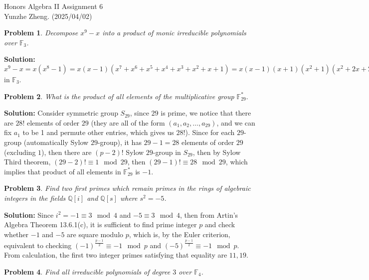 \documentclass[12pt]{article}
\newtheorem{problem}{Problem}
\begin{document}
\noindent Honors Algebra II \hfill Assignment 6\\
Yunzhe Zheng. (2025/04/02)

\hrulefill

\begin{problem}
Decompose $x^9-x$ into a product of monic irreducible polynomials over $\mathbb{F}_{3}$.
\end{problem}

\textbf{Solution:} $x^9-x=x(x^8-1)=x(x-1)(x^7+x^6+x^5+x^4+x^3+x^2+x+1)=x(x-1)(x+1)(x^2+1)(x^2+2x+2)(x^2+x+2)$ in $\mathbb{F}_3$.
\\
\begin{problem}
What is the product of all elements of the multiplicative group $\mathbb{F}_{29}^{*}.$
\end{problem}

\textbf{Solution:} Consider symmetric group $S_{29}$, since $29$ is prime, we notice that there are $28!$ elements of order $29$ (they are all of the form $(a_{1}, a_{2}, \dots, a_{29})$, and we can fix $a_1$ to be 1 and permute other entries, which gives us $28!$). Since for each $29$-group (automatically Sylow $29$-group), it has $29-1=28$ elements of order $29$ (excluding $1$), then there are $(p-2)!$ Sylow $29$-group in $S_{29}$, then by Sylow Third theorem, $(29-2)!\equiv 1\mod 29$, then $(29-1)!\equiv 28\mod 29$, which implies that product of all elements in $\mathbb{F}_{29}^*$ is $-1$.
\\
\begin{problem}
Find two first primes which remain primes in the rings of algebraic integers in the fields $\mathbb{Q}[i]$ and $\mathbb{Q}[s]$ where $s^2=-5$. 
\end{problem}

\textbf{Solution:} Since $i^2=-1\equiv 3\mod 4$ and $-5\equiv 3\mod 4$, then from Artin's Algebra Theorem 13.6.1(c), it is sufficient to find prime integer $p$ and check whether $-1$ and $-5$ are square modulo $p$, which is, by the Euler criterion, equivalent to checking $(-1)^{\frac{p-1}{2}}\equiv -1\mod p$ and $(-5)^{\frac{p-1}{2}}\equiv -1\mod p$. From calculation, the first two integer primes satisfying that equality are $11, 19$.
\\
\begin{problem}
Find all irreducible polynomials of degree $3$ over $\mathbb{F}_4$.
\end{problem}
\end{document}
